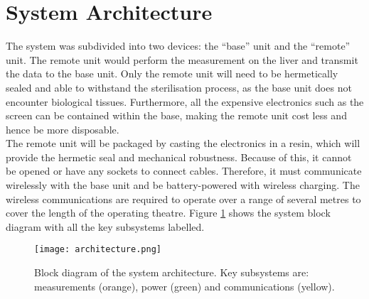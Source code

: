 \section{System Architecture}

The system was subdivided into two devices: the ``base'' unit and the ``remote'' unit. The remote unit would perform the measurement on the liver and transmit the data to the base unit. Only the remote unit will need to be hermetically sealed and able to withstand the sterilisation process, as the base unit does not encounter biological tissues. Furthermore, all the expensive electronics such as the screen can be contained within the base, making the remote unit cost less and hence be more disposable.\\

The remote unit will be packaged by casting the electronics in a resin, which will provide the hermetic seal and mechanical robustness. Because of this, it cannot be opened or have any sockets to connect cables. Therefore, it must communicate wirelessly with the base unit and be battery-powered with wireless charging. The wireless communications are required to operate over a range of several metres to cover the length of the operating theatre. Figure \ref{fig: architecture} shows the system block diagram with all the key subsystems labelled.

\begin{figure}[htb]
	\centering
	\texttt{[image: architecture.png]}
	\caption{Block diagram of the system architecture. Key subsystems are: measurements (orange), power (green) and communications (yellow).}
	\label{fig: architecture}
	\vspace{-8mm}
\end{figure}